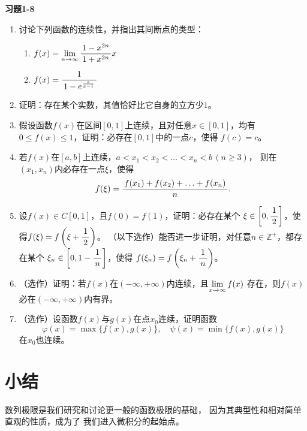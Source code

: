 \begin{ext}
	{\centering\bf 习题1-8}
	
	\begin{enumerate}  
	  \item 讨论下列函数的连续性，并指出其间断点的类型：
	  \begin{enumerate}[(1)]
	  	\item $f(x)=\lim\limits_{n\to\infty}\displaystyle\frac{\,{1-x^{2n}}\,}{\,{1+x^{2n}}\,}x$
	  	\item $f(x)=\displaystyle\frac{\,{1}\,}{\,{1-e^{\frac{x}{x-1}}}\,}$
	  \end{enumerate}
	  \item 证明：存在某个实数，其值恰好比它自身的立方少$1$。
	  \item 假设函数$f(x)$在区间$[0,1]$上连续，且对任意$x\in[0,1]$，均有
		$0\leq f(x)\leq 1$，证明：必存在$[0,1]$中的一点$c$，使得
		$f(c)=c$。
	  \item 若$f(x)$在$[a,b]$上连续，$a<x_1<x_2<\ldots<x_n<b\,(n\geq3)$，
		则在$(x_1,x_n)$内必存在一点$\xi$，使得
		$$f(\xi)=\displaystyle\frac{\,{f(x_1)+f(x_2)+\ldots+f(x_n)}\,}{\,{n}\,}.$$ 
	  \item 设$f(x)\in C[0,1]$，且$f(0)=f(1)$，证明：必存在某个
	  $\xi\in\left[0,\displaystyle\frac{\,{1}\,}{\,{2}\,}\right]$，使得$f(\xi)=f\left(\xi+\displaystyle\frac{\,{1}\,}{\,{2}\,}\right)$。
	  （以下选作）能否进一步证明，对任意$n\in\mathbb{Z}^+$，都存在某个
	  $\xi_n\in\left[0,1-\displaystyle\frac{\,{1}\,}{\,{n}\,}\right]$，使得
	  $f(\xi_n)=f\left(\xi_n+\displaystyle\frac{\,{1}\,}{\,{n}\,}\right)$。
	  \item （选作）证明：若$f(x)$在$(-\infty,+\infty)$内连续，且$\lim\limits_{x\to{\infty}}f(x)$
		存在，则$f(x)$必在$(-\infty,+\infty)$内有界。
	  \item （选作）设函数$f(x)$与$g(x)$在点$x_0$连续，证明函数
		$$\varphi(x)=\max\{f(x),g(x)\},\quad
		\psi(x)=\min\{f(x),g(x)\}$$
		在$x_0$也连续。
	\end{enumerate}
\end{ext}

\newpage
\section*{小结}

数列极限是我们研究和讨论更一般的函数极限的基础，
因为其典型性和相对简单直观的性质，成为了
我们进入微积分的起始点。

